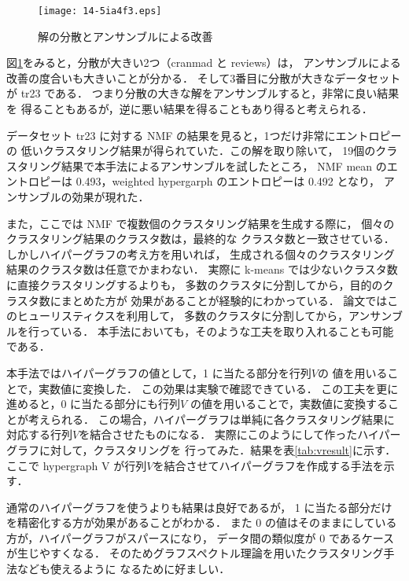 \documentclass[japanese]{jnlp_1.3e}
\begin{document}
\begin{figure}[tbp]
\begin{center}
\texttt{[image: 14-5ia4f3.eps]}
\caption{解の分散とアンサンブルによる改善}\label{kou}
\end{center}
\end{figure}

\mbox{図\ref{kou}}をみると，分散が大きい2つ（cranmad と reviews）は，
アンサンブルによる改善の度合いも大きいことが分かる．
そして3番目に分散が大きなデータセットが tr23 である．
つまり分散の大きな解をアンサンブルすると，非常に良い結果を
得ることもあるが，逆に悪い結果を得ることもあり得ると考えられる．

データセット tr23 に対する NMF の結果を見ると，1つだけ非常にエントロピーの
低いクラスタリング結果が得られていた．この解を取り除いて，
19個のクラスタリング結果で本手法によるアンサンブルを試したところ，
NMF mean のエントロピーは 0.493，weighted hypergarph のエントロピーは 0.492 となり，
アンサンブルの効果が現れた．

また，ここでは NMF で複数個のクラスタリング結果を生成する際に，
個々のクラスタリング結果のクラスタ数は，最終的な
クラスタ数と一致させている．
しかしハイパーグラフの考え方を用いれば，
生成される個々のクラスタリング結果のクラスタ数は任意でかまわない．
実際に k-means では少ないクラスタ数に直接クラスタリングするよりも，
多数のクラスタに分割してから，目的のクラスタ数にまとめた方が
効果があることが経験的にわかっている．
論文\cite{fred02data}ではこのヒューリスティクスを利用して，
多数のクラスタに分割してから，アンサンブルを行っている．
本手法においても，そのような工夫を取り入れることも可能である．


本手法ではハイパーグラフの値として，1 に当たる部分を行列\( V \)の
値を用いることで，実数値に変換した．
この効果は実験で確認できている．
この工夫を更に進めると，0 に当たる部分にも行列\( V \)
の値を用いることで，実数値に変換することが考えられる．
この場合，ハイパーグラフは単純に各クラスタリング結果に
対応する行列\( V \)を結合させたものになる．
実際にこのようにして作ったハイパーグラフに対して，クラスタリングを
行ってみた．結果を表\ref{tab:vresult}に示す．
ここで hypergraph V が行列\( V \)を結合させてハイパーグラフを作成する手法を示す．

\begin{table}[tbp]

\end{table}

通常のハイパーグラフを使うよりも結果は良好であるが，
1 に当たる部分だけを精密化する方が効果があることがわかる．
また 0 の値はそのままにしている方が，ハイパーグラフがスパースになり，
データ間の類似度が 0 であるケースが生じやすくなる．
そのためグラフスペクトル理論を用いたクラスタリング手法\cite{graph-minmax-cut}なども使えるように
なるために好ましい．
\end{document}
